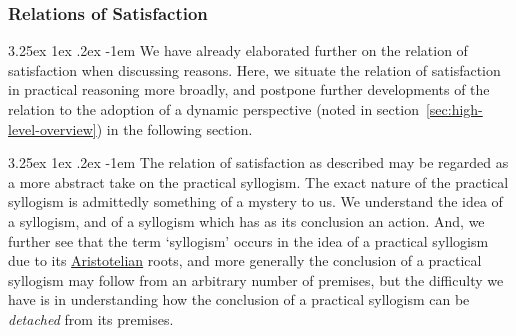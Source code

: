 \documentclass[10pt]{article}
\makeatletter
\renewcommand\paragraph{\@startsection{paragraph}{5}{\z@}%
  {3.25ex \@plus1ex \@minus.2ex}%
  {-1em}%
  {\normalfont\normalsize\bfseries}}
\makeatother
\begin{document}
\subsubsection{Relations of Satisfaction}
\label{sec:relat-satisf}

\paragraph{ } %
We have already elaborated further on the relation of satisfaction when discussing reasons.
Here, we situate the relation of satisfaction in practical reasoning more broadly, and postpone further developments of the relation to the adoption of a dynamic perspective (noted in section~\ref{sec:high-level-overview}) in the following section.

\paragraph{ } %
The relation of satisfaction as described may be regarded as a more abstract take on the practical syllogism.
The exact nature of the practical syllogism is admittedly something of a mystery to us.
We understand the idea of a syllogism, and of a syllogism which has as its conclusion an action.
And, we further see that the term `syllogism' occurs in the idea of a practical syllogism due to its \hyperlink{Broadie:2002aa}{Aristotelian} roots, and more generally the conclusion of a practical syllogism may follow from an arbitrary number of premises, but the difficulty we have is in understanding how the conclusion of a practical syllogism can be \emph{detached} from its premises.
\end{document}
